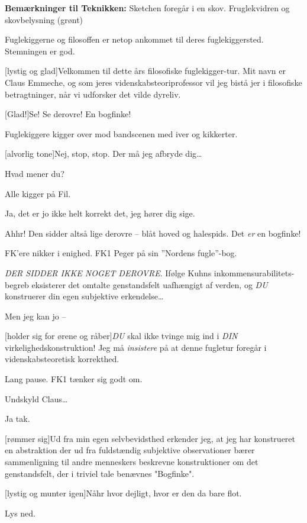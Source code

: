 \documentclass[a4paper,12pt]{article}
\begin{document}
\begin{sketch}

\scene \textbf{Bemærkninger til Teknikken:}
Sketchen foregår i en skov. Fruglekvidren og skovbelysning (grønt)


\scene Fuglekiggerne og filosoffen er netop ankommet til deres fuglekiggersted. Stemningen er god.

[lystig og glad]Velkommen til dette års filosofiske fuglekigger-tur. Mit navn er Claus Emmeche, og som jeres videnskabsteoriprofessor vil jeg bistå jer i filosofiske betragtninger, når vi udforsker det vilde dyreliv.

[Glad!]Se! Se derovre! En bogfinke!

\scene Fuglekiggere kigger over mod bandscenen med iver og kikkerter.

[alvorlig tone]Nej, stop, stop. Der må jeg afbryde dig\ldots

Hvad mener du?

\scene Alle kigger på Fil.

Ja, det er jo ikke helt korrekt det, jeg hører dig sige.

Ahhr! Den sidder altså lige derovre -- blåt hoved og halespids. 
Det \emph{er} en bogfinke!

\scene FK'ere nikker i enighed. FK1 Peger på sin ''Nordens fugle''-bog.

\emph{DER SIDDER IKKE NOGET DEROVRE}. Ifølge Kuhns inkommensurabilitets-begreb eksisterer det omtalte genstandsfelt uafhængigt af verden, og \emph{DU} konstruerer din egen subjektive erkendelse\ldots {}

Men jeg kan jo --

[holder sig for ørene og råber]\emph{DU} skal ikke tvinge mig ind i \emph{DIN} virkelighedskonstruktion!  Jeg må \emph{insistere} på at denne fugletur foregår i videnskabsteoretisk korrekthed.

\scene Lang pause. FK1 tænker sig godt om.

Undskyld Claus\ldots

Ja tak.

[rømmer sig]Ud fra min egen selvbevidsthed erkender jeg, at jeg har konstrueret en abstraktion der ud fra fuldstændig subjektive observationer bærer sammenligning til andre menneskers beskrevne konstruktioner om det genstandsfelt, der i triviel tale benævnes "Bogfinke".

[lystig og munter igen]Nåhr hvor dejligt, hvor er den da bare flot.

Lys ned.

\end{sketch}
\end{document}
